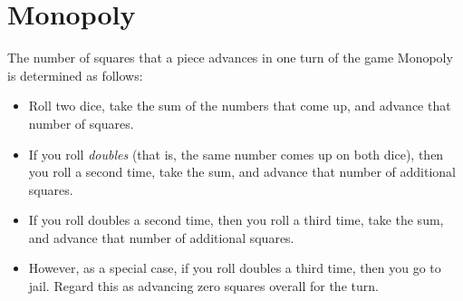 \documentclass[12pt]{article}
\begin{document}


\newpage

\section{Monopoly}
The number of squares that a piece advances in one turn of the game
Monopoly is determined as follows:

\begin{itemize}

\item Roll two dice, take the sum of the numbers that come up, and
advance that number of squares.

\item If you roll {\em doubles} (that is, the same number comes up on
both dice), then you roll a second time, take the sum, and advance
that number of additional squares.

\item If you roll doubles a second time, then you roll a third time,
take the sum, and advance that number of additional squares.

\item However, as a special case, if you roll doubles a third time,
then you go to jail.  Regard this as advancing zero squares overall
for the turn.

\end{itemize}
\end{document}
